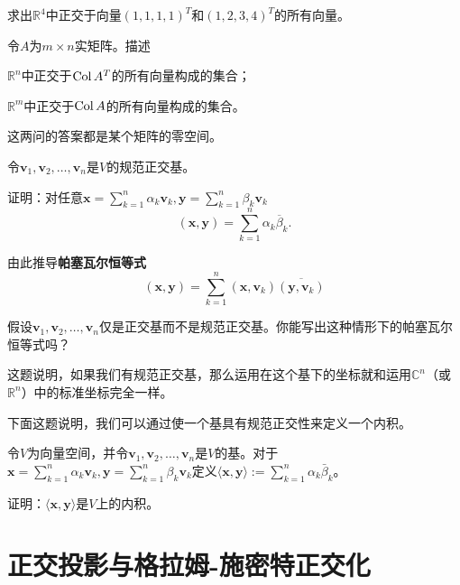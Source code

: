 \begin{problemset}
    \item 求出$\mathbb{R}^4$中正交于向量$(1,1,1,1)^T$和$(1,2,3,4)^T$的所有向量。
    \item 令$A$为$m\times n$实矩阵。描述
    \begin{probenumerate}
        \item $\mathbb{R}^n$中正交于$\operatorname{Col} A^T$的所有向量构成的集合；
        \item $\mathbb{R}^m$中正交于$\operatorname{Col} A$的所有向量构成的集合。
    \end{probenumerate}
    这两问的答案都是某个矩阵的零空间。
    \item \label{ex:5_2_3} 令$\mathbf{v}_1,\mathbf{v}_2,\ldots,\mathbf{v}_n$是$V$的规范正交基。
    \begin{probenumerate}
        \item 证明：对任意$\mathbf{x}=\sum_{k=1}^{n}\alpha_{k}\mathbf{v}_{k},\mathbf{y}=\sum_{k=1}^{n}\beta_{k}\mathbf{v}_{k}$
        \[(\mathbf{x},\mathbf{y})=\sum_{k=1}^{n}\alpha_{k}\overline{\beta}_{k}.\]
        \item 由此推导\textbf{帕塞瓦尔恒等式}
        \[(\mathbf{x},\mathbf{y})=\sum_{k=1}^n(\mathbf{x},\mathbf{v}_k)\overline{(\mathbf{y},\mathbf{v}_k)}\]
        \item 假设$\mathbf{v}_1,\mathbf{v}_2,\ldots,\mathbf{v}_n$仅是正交基而不是规范正交基。你能写出这种情形下的帕塞瓦尔恒等式吗？
    \end{probenumerate}

    这题说明，如果我们有规范正交基，那么运用在这个基下的坐标就和运用$\mathbb{C}^n$（或$\mathbb{R}^n$）中的标准坐标完全一样。

    下面这题说明，我们可以通过使一个基具有规范正交性来定义一个内积。
    \item \label{ex:5_2_4} 令$V$为向量空间，并令$\mathbf{v}_1,\mathbf{v}_2,\ldots,\mathbf{v}_n$是$V$的基。对于$\mathbf{x}=\sum_{k=1}^n\alpha_k\mathbf{v}_k,\mathbf{y}=\sum_{k=1}^n\beta_k\mathbf{v}_k$定义$\langle\mathbf{x},\mathbf{y}\rangle:=\sum_{k=1}^{n}\alpha_{k}\bar{\beta}_{k}$。
    
    证明：$\langle\mathbf{x},\mathbf{y}\rangle$是$V$上的内积。
\end{problemset}

\section{正交投影与格拉姆-施密特正交化}\label{sec:orthogonalization}

